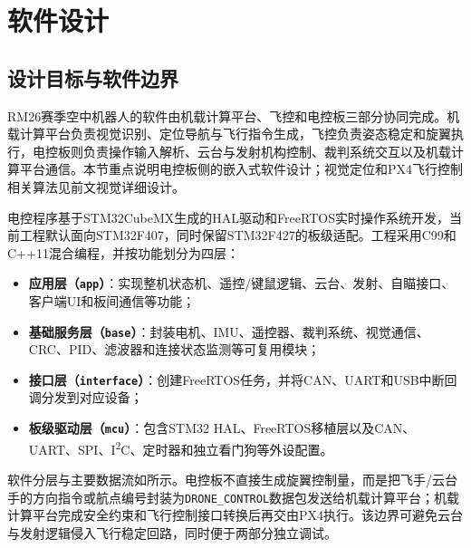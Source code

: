 \section{软件设计}

\subsection{设计目标与软件边界}

RM26赛季空中机器人的软件由机载计算平台、飞控和电控板三部分协同完成。机载计算平台负责视觉识别、定位导航与飞行指令生成，飞控负责姿态稳定和旋翼执行，电控板则负责操作输入解析、云台与发射机构控制、裁判系统交互以及机载计算平台通信。本节重点说明电控板侧的嵌入式软件设计；视觉定位和PX4飞行控制相关算法见前文视觉详细设计。

电控程序基于STM32CubeMX生成的HAL驱动和FreeRTOS实时操作系统开发，当前工程默认面向STM32F407，同时保留STM32F427的板级适配。工程采用C99和C++11混合编程，并按功能划分为四层：

\begin{itemize}
    \item \textbf{应用层（\texttt{app}）}：实现整机状态机、遥控/键鼠逻辑、云台、发射、自瞄接口、客户端UI和板间通信等功能；
    \item \textbf{基础服务层（\texttt{base}）}：封装电机、IMU、遥控器、裁判系统、视觉通信、CRC、PID、滤波器和连接状态监测等可复用模块；
    \item \textbf{接口层（\texttt{interface}）}：创建FreeRTOS任务，并将CAN、UART和USB中断回调分发到对应设备；
    \item \textbf{板级驱动层（\texttt{mcu}）}：包含STM32 HAL、FreeRTOS移植层以及CAN、UART、SPI、I\textsuperscript{2}C、定时器和独立看门狗等外设配置。
\end{itemize}

软件分层与主要数据流如所示。电控板不直接生成旋翼控制量，而是把飞手/云台手的方向指令或航点编号封装为\texttt{DRONE\_CONTROL}数据包发送给机载计算平台；机载计算平台完成安全约束和飞行控制接口转换后再交由PX4执行。该边界可避免云台与发射逻辑侵入飞行稳定回路，同时便于两部分独立调试。

